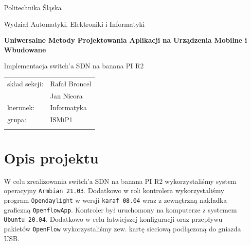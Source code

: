 \documentclass[12pt,a4paper,twoside]{article}
\begin{document}
\frenchspacing
\thispagestyle{empty}
\begin{center}
{\Large\sf Politechnika Śląska   %

Wydział Automatyki, Elektroniki i Informatyki

}

\vfill

 

\vfill\vfill

{\Huge\sffamily\bfseries Uniwersalne Metody Projektowania Aplikacji na Urządzenia Mobilne i Wbudowane\par}  

\vfill\vfill

{\LARGE\sf Implementacja switch'a SDN na banana PI R2}   


\vfill \vfill\vfill\vfill






\begin{tabular}{ll}
	\toprule
	skład sekcji:	&	Rafał Broncel\\
					&	Jan Nieora\\
	kierunek:		& Informatyka\\
	grupa: 			& ISMiP1 \\
	
	\bottomrule
	                            &
\end{tabular}

\end{center}

\cleardoublepage


\section{Opis projektu}
W celu zrealizowania  switch'a SDN na banana PI R2 wykorzystaliśmy system operacyjny \texttt{Armbian 21.03}. Dodatkowo w roli kontrolera wykorzystaliśmy program \texttt{Opendaylight} w wersji \texttt{karaf 08.04} wraz z zewnętrzną nakładka graficzną \texttt{OpenflowApp}. Kontroler był uruchomony na komputerze z systemem \texttt{Ubuntu 20.04}. Dodatkowo w celu łatwiejszej konfiguracji oraz przepływu pakietów \texttt{OpenFlow} wykorzystaliśmy zew. kartę sieciową podłączoną do gniazda USB.
\end{document}
